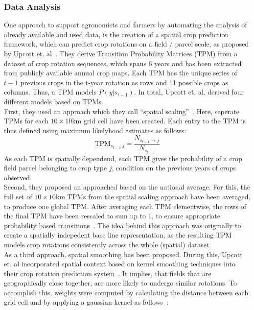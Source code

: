 \documentclass{Academic}
\begin{document}
    \subsubsection{Data Analysis} %
    One approach to support agronomists and farmers by automating the analysis of already available and used data, is the creation of a spatial crop prediction framework, which can predict crop rotations on a field / parcel scale, as proposed by Upcott et. al~\cite{upcott_new_2023}. They derive Transition Probability Matrices (TPM) from a dataset of crop rotation sequences, which spans 6 years and has been extracted from publicly available annual crop maps. Each TPM has the unique series of $t-1$ previous crops in the t-year rotation as rows and 11 possible crops as columns. Thus, a TPM models $P(y|s_{t-1})$. In total, Upcott et. al. derived four different models based on TPMs.\\
    First, they used an approach which they call \enquote{spatial scaling}~\cite{upcott_new_2023}. Here, seperate TPMs for each $10\times 10$km grid cell have been created. Each entry to the TPM is thus defined using maximum likelyhood estimates as follows:
    $$\mathrm{TPM}_{s_{t-1},j} = \frac{N_{s_{t-1} \rightarrow j}}{N_{s_{t-1}}}$$
    As each TPM is spatially dependend, each TPM gives the probability of a crop field parcel belonging to crop type $j$, condition on the previous years of crops observed. \\
    Second, they proposed an approached based on the national average. For this, the full set of $10\times 10$km TPMs from the spatial scaling approach have been averaged, to produce one global TPM. After averaging each TPM elementwise, the rows of the final TPM have been rescaled to sum up to 1, to ensure appropriate probability based transitions~\cite{upcott_new_2023}. The idea behind this approach was originally to create a spatially indepedent base line representation, as the resulting TPM models crop rotations consistently across the whole (spatial) dataset. \\
    As a third approach, spatial smoothing has been proposed. During this, Upcott et. al incorporated spatial context based on kernel smoothing techniques into their crop rotation prediction system~\cite{upcott_new_2023}. It implies, that fields that are geographically close together, are more likely to undergo similar rotations. To accomplish this, weights were computed by calculating the distance between each grid cell and by applying a gaussian kernel as follows~\cite{upcott_new_2023}:
\end{document}
